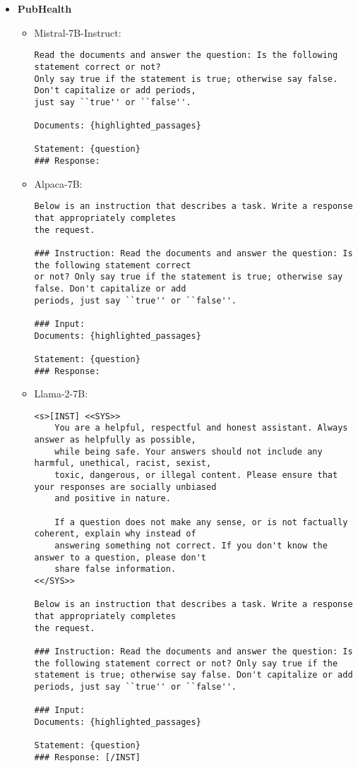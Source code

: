 \begin{itemize}
    \item \textbf{PubHealth}
    \begin{itemize}
        \item Mistral-7B-Instruct:
        \begin{lstlisting}[basicstyle=\small\ttfamily,breaklines=true]
Read the documents and answer the question: Is the following statement correct or not?
Only say true if the statement is true; otherwise say false. Don't capitalize or add periods,
just say ``true'' or ``false''.

Documents: {highlighted_passages}

Statement: {question}
### Response:
        \end{lstlisting}
        \item Alpaca-7B:
        \begin{lstlisting}[basicstyle=\small\ttfamily,breaklines=true]
Below is an instruction that describes a task. Write a response that appropriately completes
the request.

### Instruction: Read the documents and answer the question: Is the following statement correct
or not? Only say true if the statement is true; otherwise say false. Don't capitalize or add
periods, just say ``true'' or ``false''.

### Input:
Documents: {highlighted_passages}

Statement: {question}
### Response: 
        \end{lstlisting}
        \item Llama-2-7B:
        \begin{lstlisting}[basicstyle=\small\ttfamily,breaklines=true]
<s>[INST] <<SYS>>
    You are a helpful, respectful and honest assistant. Always answer as helpfully as possible,
    while being safe. Your answers should not include any harmful, unethical, racist, sexist,
    toxic, dangerous, or illegal content. Please ensure that your responses are socially unbiased
    and positive in nature.

    If a question does not make any sense, or is not factually coherent, explain why instead of
    answering something not correct. If you don't know the answer to a question, please don't
    share false information.
<</SYS>>

Below is an instruction that describes a task. Write a response that appropriately completes
the request.

### Instruction: Read the documents and answer the question: Is the following statement correct or not? Only say true if the statement is true; otherwise say false. Don't capitalize or add
periods, just say ``true'' or ``false''.

### Input:
Documents: {highlighted_passages}

Statement: {question}
### Response: [/INST]
        \end{lstlisting}
    \end{itemize}
\end{itemize}
\normalsize
